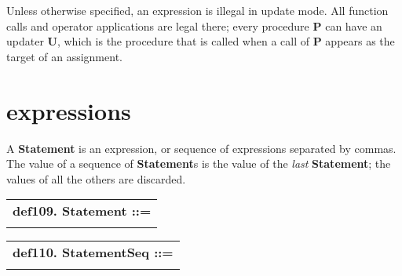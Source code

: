 \documentclass{report}
\begin{document}
Unless otherwise specified, an expression is illegal in update mode.
All function calls and operator applications are legal there; every
procedure {\bf P} can have an updater {\bf U}, which is the procedure that is
called when a call of {\bf P} appears as the target of an assignment.

\section{expressions}


A {\bf Statement} is an expression, or sequence of expressions separated
by commas. The value of a sequence of {\bf Statement}s is the value of the
{\em last} {\bf Statement}; the values of all the others are discarded.

\begin{tabular}{l}
{\bf def109. Statement ::= }\\ 
\hspace*{3mm}{\tt Expr++ "," SEMI} \\ 
\end{tabular}

\begin{tabular}{l}
{\bf def110. StatementSeq ::= }\\ 
\hspace*{3mm}{\tt Statement*} \\ 
\end{tabular}
\end{document}
